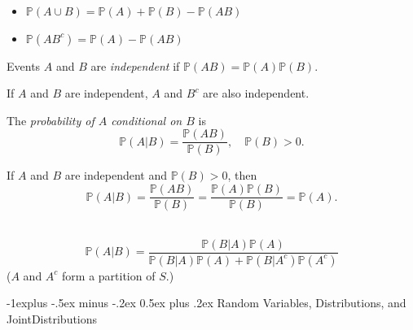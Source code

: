 \documentclass[a4paper,10pt,landscape]{article}
\makeatletter
\renewcommand{\subsection}{\@startsection{subsection}{2}{0mm}%
                                {-1explus -.5ex minus -.2ex}%
                                {0.5ex plus .2ex}%
                                {\normalfont\normalsize\bfseries}}
\makeatother
\begin{document}
\begin{multicols*}{3}
\begin{description}
\begin{itemize}[itemsep=0.5pt]
		\item $\mathbb{P}\left(A\cup B\right)=\mathbb{P}\left(A\right)+\mathbb{P}\left(B\right)-\mathbb{P}\left(AB\right)$
		\item $\mathbb{P}\left(AB^c\right)=\mathbb{P}\left(A\right)-\mathbb{P}\left(AB\right)$
	\end{itemize}
	\item[Independence] Events $A$ and $B$ are {\it independent} if $\mathbb{P}\left(AB\right)=\mathbb{P}\left(A\right)\mathbb{P}\left(B\right)$.
	\item[Theorem] If $A$ and $B$ are independent, $A$ and $B^c$ are also independent.
	\item[Conditional Probability] The {\it probability of $A$ conditional on $B$} is
	$$\mathbb{P}\left(A|B\right)=\frac{\mathbb{P}\left(AB\right)}{\mathbb{P}\left(B\right)},\quad\mathbb{P}\left(B\right)>0.$$
	\item If $A$ and $B$ are independent and $\mathbb{P}\left(B\right)>0$, then $$\mathbb{P}\left(A|B\right)=\frac{\mathbb{P}\left(AB\right)}{\mathbb{P}\left(B\right)}=\frac{\mathbb{P}\left(A\right)\mathbb{P}\left(B\right)}{\mathbb{P}\left(B\right)}=\mathbb{P}\left(A\right).$$
	\item[Bayes' Theorem] ~
	$$\mathbb{P}\left(A|B\right)=\frac{\mathbb{P}\left(B|A\right)\mathbb{P}\left(A\right)}{\mathbb{P}\left(B|A\right)\mathbb{P}\left(A\right)+\mathbb{P}\left(B|A^c\right)\mathbb{P}\left(A^c\right)}$$
	($A$ and $A^c$ form a partition of $S$.)
\end{description}

\subsection{Random Variables, Distributions, and Joint\newline Distributions}


\end{multicols*}
\end{document}
